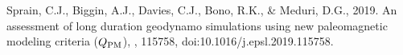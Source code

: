 \begin{thebibliography}{}
%
Sprain, C.J., Biggin, A.J., Davies, C.J., Bono, R.K., \& Meduri, D.G., 2019. An assessment of long duration geodynamo simulations using new paleomagnetic modeling criteria ($Q_{\rm PM}$), , 115758, doi:10.1016/j.epsl.2019.115758.
%
%

\end{thebibliography}
